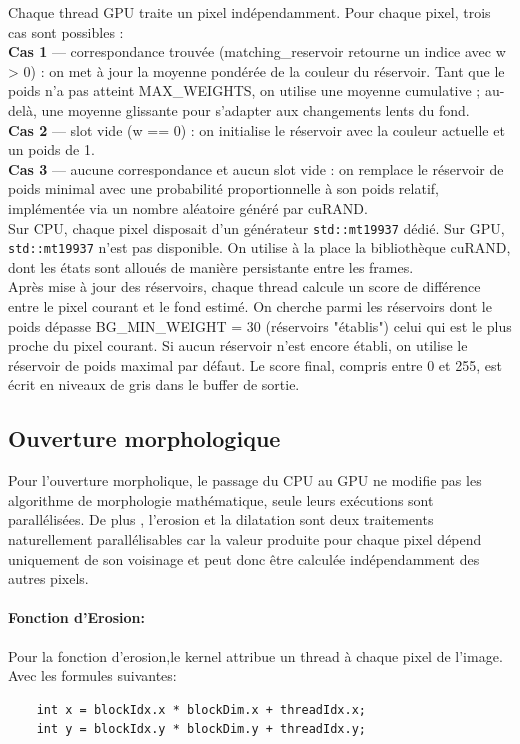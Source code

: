 \documentclass[12pt]{article}
\begin{document}
    Chaque thread GPU traite un pixel indépendamment. Pour chaque pixel, trois cas sont possibles :
    \\
    \textbf{Cas 1} — correspondance trouvée (matching\_reservoir retourne un indice avec w > 0) : on met à jour la moyenne pondérée de la couleur du réservoir. Tant que le poids n'a pas atteint MAX\_WEIGHTS, on utilise une moyenne cumulative ; au-delà, une moyenne glissante pour s'adapter aux changements lents du fond. \\
    \textbf{Cas 2} — slot vide (w == 0) : on initialise le réservoir avec la couleur actuelle et un poids de 1. \\
    \textbf{Cas 3} — aucune correspondance et aucun slot vide : on remplace le réservoir de poids minimal avec une probabilité proportionnelle à son poids relatif, implémentée via un nombre aléatoire généré par cuRAND.
    \\
    Sur CPU, chaque pixel disposait d'un générateur \verb|std::mt19937| dédié. Sur GPU, \verb|std::mt19937| n'est pas disponible. On utilise à la place la bibliothèque cuRAND, dont les états sont alloués de manière persistante entre les frames.
    \\
    Après mise à jour des réservoirs, chaque thread calcule un score de différence entre le pixel courant et le fond estimé. On cherche parmi les réservoirs dont le poids dépasse BG\_MIN\_WEIGHT = 30 (réservoirs "établis") celui qui est le plus proche du pixel courant. Si aucun réservoir n'est encore établi, on utilise le réservoir de poids maximal par défaut. Le score final, compris entre 0 et 255, est écrit en niveaux de gris dans le buffer de sortie.

    \subsection{Ouverture morphologique}
   Pour l'ouverture morpholique, le passage du CPU au GPU ne modifie pas les algorithme de morphologie mathématique, seule leurs exécutions sont parallélisées. De plus , l'erosion et la dilatation sont deux traitements naturellement parallélisables car la valeur produite pour chaque pixel dépend uniquement de son voisinage et peut donc être calculée indépendamment des autres pixels.
    \paragraph{Fonction d'Erosion:} 
    Pour la fonction d'erosion,le kernel attribue un thread à chaque pixel de l'image. Avec les formules suivantes:
      \begin{verbatim}
    int x = blockIdx.x * blockDim.x + threadIdx.x;
    int y = blockIdx.y * blockDim.y + threadIdx.y;
    \end{verbatim}
\end{document}
